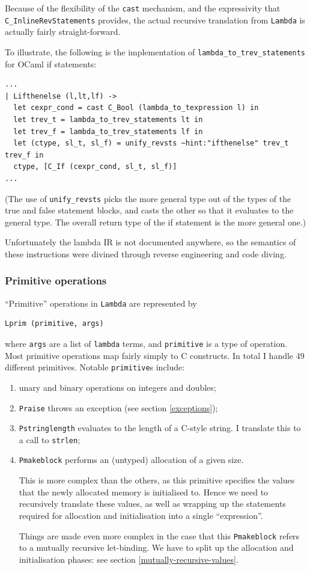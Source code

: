 \documentclass[12pt,a4paper,twoside,openright]{report}
\begin{document}
Because of the flexibility of the \lstinline!cast! mechanism, and the
expressivity that \lstinline!C_InlineRevStatements! provides, the actual
recursive translation from \lstinline!Lambda! is actually fairly straight-forward.

To illustrate, the following is the implementation of
\lstinline!lambda_to_trev_statements! for OCaml if statements:
\begin{lstlisting}
...
| Lifthenelse (l,lt,lf) ->
  let cexpr_cond = cast C_Bool (lambda_to_texpression l) in
  let trev_t = lambda_to_trev_statements lt in
  let trev_f = lambda_to_trev_statements lf in
  let (ctype, sl_t, sl_f) = unify_revsts ~hint:"ifthenelse" trev_t trev_f in
  ctype, [C_If (cexpr_cond, sl_t, sl_f)]
...\end{lstlisting}

(The use of \lstinline!unify_revsts! picks the more general type out of the
types of the true and false statement blocks, and casts the other so that it
evaluates to the general type.  The overall return type of the if statement is the
more general one.)

Unfortunately the lambda IR is not documented anywhere, so the semantics
of these instructions were divined through reverse engineering and code diving.

\subsubsection{Primitive operations}

``Primitive'' operations in \lstinline!Lambda! are represented by
\begin{lstlisting}
Lprim (primitive, args)\end{lstlisting}
where \lstinline!args! are a list of \lstinline!lambda! terms, and
\lstinline!primitive! is a type of operation. Most primitive operations map
fairly simply to C constructs. In total I handle 49 different primitives.
Notable \lstinline!primitive!s include:
\begin{enumerate}
  \item unary and binary operations on integers and doubles;
  \item \lstinline!Praise! throws an exception (see section \ref{exceptions});
  \item \lstinline!Pstringlength! evaluates to the length of a C-style string. I translate this to a call to \lstinline!strlen!;
  \item \lstinline!Pmakeblock! performs an (untyped) allocation of a given size.

    This is more complex than the others, as this primitive specifies
    the values that the newly allocated memory is initialised to. Hence we need
    to recursively translate these values, as well as wrapping up the
    statements required for allocation and initialisation into a single
    ``expression''.
    
    Things are made even more complex in the case that this
    \lstinline!Pmakeblock! refers to a mutually recursive let-binding. We have
    to split up the allocation and initialisation phases: see section \ref{mutually-recursive-values}.
\end{enumerate}
\end{document}
